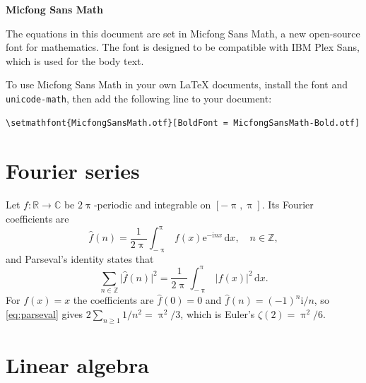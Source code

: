 \documentclass[11pt]{article}
\begin{document}
\begin{center}
  {\LARGE\bfseries Micfong Sans Math}\par\smallskip
\end{center}

The equations in this document are set in Micfong Sans Math, a new open-source font for mathematics. The font is designed to be compatible with IBM Plex Sans, which is used for the body text.

To use Micfong Sans Math in your own LaTeX documents, install the font and \texttt{unicode-math}, then add the following line to your document:

\begin{verbatim}
\setmathfont{MicfongSansMath.otf}[BoldFont = MicfongSansMath-Bold.otf]
\end{verbatim}

\section{Fourier series}

Let $f\colon \mathbb{R} \to \mathbb{C}$ be $2\uppi$-periodic and integrable on $[-\uppi, \uppi]$.
Its Fourier coefficients are
\begin{equation}
  \hat{f}(n) = \frac{1}{2\uppi} \int_{-\uppi}^{\uppi} f(x) \mathrm{e}^{-\mathrm{i}nx} \,\mathrm{d}x, \quad n \in \mathbb{Z},
\end{equation}
and Parseval's identity states that
\begin{equation}\label{eq:parseval}
  \sum_{n \in \mathbb{Z}} \lvert\hat{f}(n)\rvert^2 = \frac{1}{2\uppi} \int_{-\uppi}^{\uppi} \lvert f(x)\rvert^2 \,\mathrm{d}x.
\end{equation}
For $f(x) = x$ the coefficients are $\hat{f}(0) = 0$ and $\hat{f}(n) = (-1)^n \mathrm{i}/n$, so
\eqref{eq:parseval} gives $2\sum_{n \ge 1} 1/n^2 = \uppi^2/3$, which is Euler's $\zeta(2) = \uppi^2/6$.

\section{Linear algebra}
\end{document}
